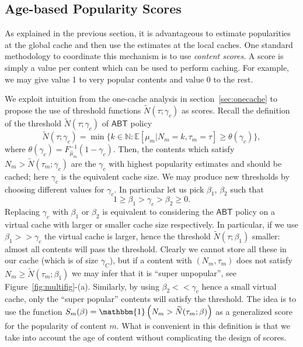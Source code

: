 \documentclass[10pt, conference, letterpaper]{IEEEtran}
\newcommand{\ABT}{\textsf{ABT}}
\newcommand{\mean}[1]{\mathbb{E}\!\left[#1\right]}
\def\N{\mathbb{N}}
\def\ind{\mathbbm{1}}
\begin{document}
\subsection{Age-based Popularity Scores}

As explained in the previous section, it is advantageous to estimate popularities at the global cache and then use the estimates at the local caches. One standard methodology to coordinate this mechanism is to use \emph{content scores}. A score is simply a value per content which can be used to perform caching. For example, we may give value 1 to very popular contents and value 0 to the rest. 

We exploit intuition from the one-cache analysis in section~\ref{sec:onecache} to propose the use of threshold functions $\widetilde N(\tau;\gamma_c)$ as scores. 
Recall the definition of the threshold $\widetilde N(\tau;\gamma_c)$
of $\ABT$ policy
\begin{equation*}\widetilde N(\tau;\gamma_c)=\min\{k\in \N : \mean{\mu_m|N_m=k,\tau_m=\tau}\geq \theta(\gamma_c)\},
\end{equation*}
where $\theta(\gamma_c)=F^{-1}_{\widehat\mu_m}(1-\gamma_c)$.
Then, the contents which satisfy $N_m>\widetilde N(\tau_m;\gamma_c)$ are the $\gamma_c$ with highest popularity estimates and should be cached; 
here $\gamma_c$ is the equivalent cache size.
We may produce new thresholds by choosing different values for $\gamma_c$. In particular let us pick $\beta_1$, $\beta_2$ such that
\[
1\geq \beta_1> \gamma_c >\beta_2\geq 0.
\]
Replacing $\gamma_c$ with $\beta_1$ or $\beta_2$ is equivalent to considering the $\ABT$ policy on a virtual cache with larger or smaller cache size respectively. In particular, if we use $\beta_1>>\gamma_c$ the virtual cache is larger, hence the threshold $\widetilde N(\tau;\beta_1)$ smaller: almost all contents will pass the threshold. Clearly we cannot store all these in our cache (which is of size $\gamma_C$), but if a content with $(N_m,\tau_m)$ does not satisfy $N_m\geq \widetilde N(\tau_m;\beta_1)$ we may infer that it is ``super unpopular'', see Figure~\ref{fig:multifig}-(a). Similarly, by using $\beta_2<<\gamma_c$ hence a small virtual cache, only the ``super popular'' contents will satisfy the threshold.
The idea is to use  the function $S_m(\beta) =\ind\left(N_m>\widetilde N(\tau_m;\beta)\right)$ as a generalized score for the popularity of content $m$. 
What is convenient in this definition is that we take into account the age of content without complicating the design of scores.
\end{document}
